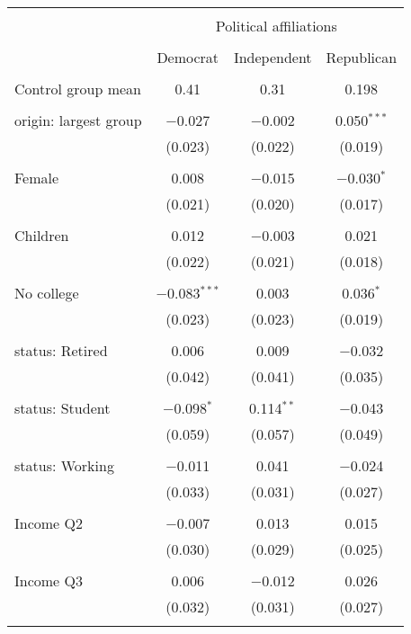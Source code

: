 
\begin{tabular}{@{\extracolsep{5pt}}lccc} 
\\[-1.8ex]\hline 
\hline \\[-1.8ex] 
 & \multicolumn{3}{c}{Political affiliations} \\ 
\cline{2-4} 
\\[-1.8ex] & Democrat & Independent & Republican \\ 
\hline \\[-1.8ex] 
 Control group mean & 0.41 & 0.31 & 0.198  \\ \hline \\[-1.8ex] origin: largest group & $-$0.027 & $-$0.002 & 0.050$^{***}$ \\ 
  & (0.023) & (0.022) & (0.019) \\ 
  & & & \\ 
 Female & 0.008 & $-$0.015 & $-$0.030$^{*}$ \\ 
  & (0.021) & (0.020) & (0.017) \\ 
  & & & \\ 
 Children & 0.012 & $-$0.003 & 0.021 \\ 
  & (0.022) & (0.021) & (0.018) \\ 
  & & & \\ 
 No college & $-$0.083$^{***}$ & 0.003 & 0.036$^{*}$ \\ 
  & (0.023) & (0.023) & (0.019) \\ 
  & & & \\ 
 status: Retired & 0.006 & 0.009 & $-$0.032 \\ 
  & (0.042) & (0.041) & (0.035) \\ 
  & & & \\ 
 status: Student & $-$0.098$^{*}$ & 0.114$^{**}$ & $-$0.043 \\ 
  & (0.059) & (0.057) & (0.049) \\ 
  & & & \\ 
 status: Working & $-$0.011 & 0.041 & $-$0.024 \\ 
  & (0.033) & (0.031) & (0.027) \\ 
  & & & \\ 
 Income Q2 & $-$0.007 & 0.013 & 0.015 \\ 
  & (0.030) & (0.029) & (0.025) \\ 
  & & & \\ 
 Income Q3 & 0.006 & $-$0.012 & 0.026 \\ 
  & (0.032) & (0.031) & (0.027) \\ 
  & & & \\ 

\end{tabular}
